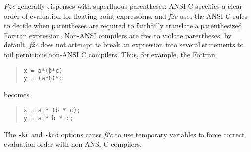 \documentclass[12pt]{article}
\begin{document}
\emph{F2c} generally dispenses with superfluous parentheses: ANSI C specifies a clear order of evaluation for floating-point expressions, and \emph{f2c} uses the ANSI C rules to decide when parentheses are required to faithfully translate a parenthesized Fortran expression. Non-ANSI compilers are free to violate parentheses; by default, \emph{f2c} does not attempt to break an expression into several statements to foil pernicious non-ANSI C compilers. Thus, for example, the Fortran
\begin{quote}
\begin{verbatim}
x = a*(b*c)
y = (a*b)*c
\end{verbatim}
\end{quote}
becomes
\begin{quote}
\begin{verbatim}
x = a * (b * c);
y = a * b * c;
\end{verbatim}
\end{quote}
The \verb|-kr| and \verb|-krd| options cause \emph{f2c} to use temporary variables to force correct evaluation order with non-ANSI C compilers.
\end{document}
